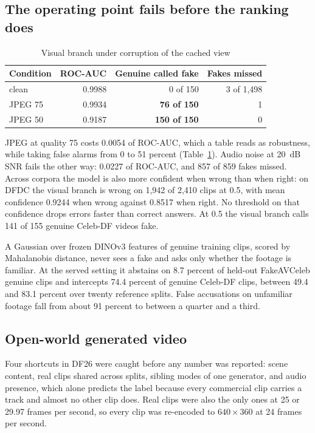 \documentclass[conference]{IEEEtran}
\begin{document}
\subsection{The operating point fails before the ranking does}

\begin{table}[htbp]
\caption{Visual branch under corruption of the cached view}
\label{tab:corruption}
\centering
\begin{tabular}{lrrr}
\toprule
Condition & ROC-AUC & Genuine called fake & Fakes missed \\
\midrule
clean & 0.9988 & 0 of 150 & 3 of 1,498 \\
JPEG 75 & 0.9934 & \textbf{76 of 150} & 1 \\
JPEG 50 & 0.9187 & \textbf{150 of 150} & 0 \\
\bottomrule
\end{tabular}
\end{table}

JPEG at quality 75 costs 0.0054 of ROC-AUC, which a table reads as robustness,
while taking false alarms from 0 to 51 percent (Table~\ref{tab:corruption}).
Audio noise at 20~dB SNR fails the other way: 0.0227 of ROC-AUC, and 857 of 859
fakes missed. Across corpora the model is also more confident when wrong than
when right: on DFDC the visual branch is wrong on 1,942 of 2,410 clips at 0.5,
with mean confidence 0.9244 when wrong against 0.8517 when right. No threshold
on that confidence drops errors faster than correct answers. At 0.5 the visual
branch calls 141 of 155 genuine Celeb-DF videos fake.

A Gaussian over frozen DINOv3 features of genuine training clips, scored by
Mahalanobis distance, never sees a fake and asks only whether the footage is
familiar. At the served setting it abstains on 8.7 percent of held-out
FakeAVCeleb genuine clips and intercepts 74.4 percent of genuine Celeb-DF
clips, between 49.4 and 83.1 percent over twenty reference splits. False
accusations on unfamiliar footage fall from about 91 percent to between a
quarter and a third.

\subsection{Open-world generated video}

Four shortcuts in DF26 were caught before any number was reported: scene
content, real clips shared across splits, sibling modes of one generator, and
audio presence, which alone predicts the label because every commercial clip
carries a track and almost no other clip does. Real clips were also the only
ones at 25 or 29.97 frames per second, so every clip was re-encoded to
$640\times360$ at 24 frames per second.
\end{document}
